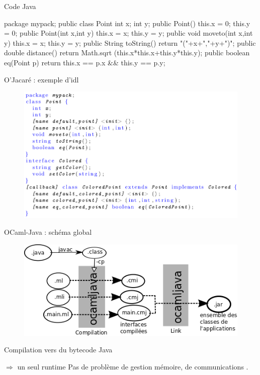 \documentclass{beamer}
\begin{document}
\begin{frame}[fragile]{Code Java}
\begin{javaEx} 
  package mypack;
  public class Point {
    int x;
    int y;
    public Point() { 
      this.x = 0;
      this.y = 0;
    }
    public Point(int x,int y) {
      this.x = x;
      this.y = y;
    }
    public void moveto(int x,int y){
      this.x = x;
      this.y = y;
    }
    public String toString() {
      return "("+x+","+y+")";
    }
    public double distance() {
      return Math.sqrt
      (this.x*this.x+this.y*this.y);
    }
    public boolean eq(Point p) {
      return this.x == p.x 
          && this.y == p.y;
    }
  }
\end{javaEx}

\end{frame}





\begin{frame}{O'Jacaré : exemple d'idl}
  
\begin{figure}[h]
  \centering
  \includegraphics[scale=0.35]{pointIdlEx.png}
\end{figure}
\end{frame}




\begin{frame}{OCaml-Java : schéma global}
\begin{figure}
  \centering
  \includegraphics[scale=0.5]{schemaOCamlJava.png}
\end{figure}
Compilation vers du bytecode Java

$\Rightarrow$ un seul runtime
Pas de problème de gestion mémoire, de communications .
\end{frame}
\end{document}
